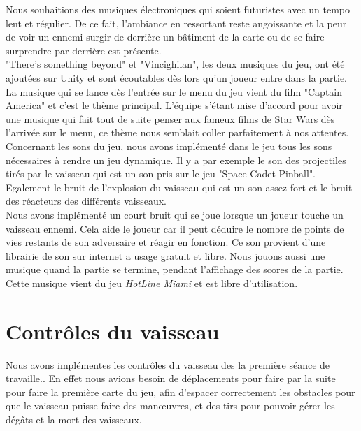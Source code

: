 \documentclass[12pt, titlepage]{article}
\begin{document}
\begin{spacing}{1.5}
Nous souhaitions des musiques électroniques qui soient futuristes avec un tempo lent et régulier. De ce fait, l'ambiance en ressortant reste angoissante et la peur de voir un ennemi surgir de derrière un bâtiment de la carte ou de se faire surprendre par derrière est présente.\\

"There's something beyond" et "Vincighilan", les deux musiques du jeu, ont été ajoutées sur Unity et sont écoutables dès lors qu'un joueur entre dans la partie. \\

La musique qui se lance dès l’entrée sur le menu du jeu vient du film "Captain America" et c’est le thème principal. L’équipe s’étant mise d’accord pour avoir une musique qui fait tout de suite penser aux fameux films de Star Wars dès l’arrivée sur le menu, ce thème nous semblait coller parfaitement à nos attentes. \\

Concernant les sons du jeu, nous avons implémenté dans le jeu tous les sons nécessaires à rendre un jeu dynamique. Il y a par exemple le son des projectiles tirés par le vaisseau qui est un son pris sur le jeu "Space Cadet Pinball". Egalement le bruit de l’explosion du vaisseau qui est un son assez fort et le bruit des réacteurs des différents vaisseaux. \\

Nous avons implémenté un court bruit qui se joue lorsque un joueur touche un vaisseau ennemi. Cela aide le joueur car il peut déduire le nombre de points de vies restants de son adversaire et réagir en fonction. Ce son provient d'une librairie de son sur internet a usage gratuit et libre. Nous jouons aussi une musique quand la partie se termine, pendant l'affichage des scores de la partie. Cette musique vient du jeu \textit{HotLine Miami} et est libre d'utilisation. \\


\newpage
\section{Contrôles du vaisseau}

Nous avons implémentes les contrôles du vaisseau des la première séance de travaille.. En effet nous avions besoin de déplacements pour faire par la suite pour faire la première carte du jeu, afin d'espacer correctement les obstacles pour que le vaisseau puisse faire des man\oe uvres, et des tirs pour pouvoir gérer les dégâts et la mort des vaisseaux.\\


\end{spacing}
\end{document}
